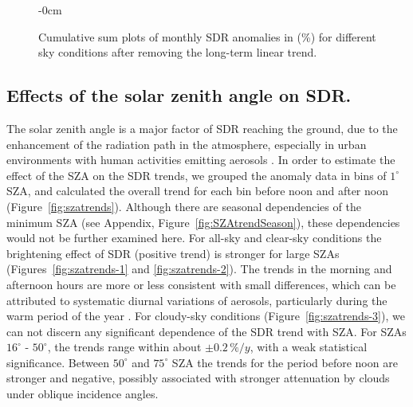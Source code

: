 \documentclass[applsci,article,submit,moreauthors,pdftex]{Definitions/mdpi}
\begin{document}
\begin{figure}[h!]
    \begin{adjustwidth}{-\extralength}{0cm}
        {\centering 
            \hfill
            \hfill
        }
        \caption{Cumulative sum plots of monthly SDR anomalies in (\%) for different sky conditions after removing the long-term linear trend.}\label{fig:cusumnotrendmonthly}
\end{adjustwidth}
\end{figure}

\hypertarget{effects-of-the-solar-zenith-angle-on-sdr.}{%
\subsection{Effects of the solar zenith angle on
SDR.}\label{effects-of-the-solar-zenith-angle-on-sdr.}}

The solar zenith angle is a major factor of SDR reaching the ground, due
to the enhancement of the radiation path in the atmosphere, especially
in urban environments with human activities emitting aerosols
\citep{Wang2021}. In order to estimate the effect of the SZA on the SDR
trends, we grouped the anomaly data in bins of \(1^\circ\) SZA, and
calculated the overall trend for each bin before noon and after noon
(Figure~\ref{fig:szatrends}). Although there are seasonal dependencies
of the minimum SZA (see Appendix, Figure~\ref{fig:SZAtrendSeason}),
these dependencies would not be further examined here. For all-sky and
clear-sky conditions the brightening effect of SDR (positive trend) is
stronger for large SZAs (Figures~\ref{fig:szatrends-1} and
\ref{fig:szatrends-2}). The trends in the morning and afternoon hours
are more or less consistent with small differences, which can be
attributed to systematic diurnal variations of aerosols, particularly
during the warm period of the year \citep{Wang2021}. For cloudy-sky
conditions (Figure~\ref{fig:szatrends-3}), we can not discern any
significant dependence of the SDR trend with SZA. For SZAs \(16^\circ\)
- \(50^\circ\), the trends range within about \(\pm 0.2\,\%/y\), with a
weak statistical significance. Between \(50^\circ\) and \(75^\circ\) SZA
the trends for the period before noon are stronger and negative,
possibly associated with stronger attenuation by clouds under oblique
incidence angles.
\end{document}
